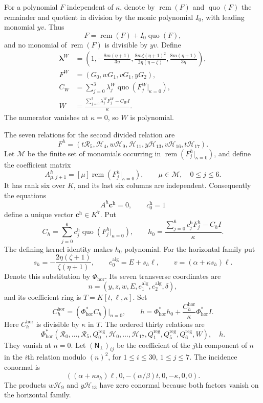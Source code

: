 \documentclass[11pt,a4paper]{article}
\numberwithin{equation}{section}
\theoremstyle{plain}
\theoremstyle{definition}
\theoremstyle{remark}
\begin{document}
For a polynomial $F$ independent of $\kappa$, denote by
$\operatorname{rem}(F)$ and $\operatorname{quo}(F)$ the remainder
and quotient in division by the monic polynomial $I_0$, with leading
monomial $yv$. Thus
\[
 F=\operatorname{rem}(F)+I_0\operatorname{quo}(F),
\]
and no monomial of $\operatorname{rem}(F)$ is divisible by $yv$.
Define
\[
\begin{aligned}
 \boldsymbol\lambda^W&=\left(1,-\frac{8m(\eta+1)}{3\eta},
       \frac{8m\zeta(\eta+1)^2}{3\eta(\eta-\zeta)},
       \frac{8m(\eta+1)}{3\eta}\right),\\
 F^W&=(G_0,wG_1,vG_1,yG_2),\\
 C_W&=\sum_{j=0}^3\lambda_j^W
           \operatorname{quo}(F^W_j|_{\kappa=0}),\\
 W&=\frac{\sum_{j=0}^3\lambda_j^WF^W_j-C_WI}{\kappa}.
\end{aligned}
\]
The numerator vanishes at $\kappa=0$, so $W$ is polynomial.

The seven relations for the second divided relation are
\[
 F^h=(t\mathcal R_5,\mathcal H_4,w\mathcal H_9,
       \mathcal H_{11},y\mathcal H_{13},
       v\mathcal H_{16},t\mathcal H_{17}).
\]
Let $\mathscr M$ be the finite set of monomials occurring in
$\operatorname{rem}(F^h_j|_{\kappa=0})$, and define the coefficient
matrix
\[
 A^h_{\mu,j+1}=[\mu]\operatorname{rem}(F^h_j|_{\kappa=0}),
 \qquad \mu\in\mathscr M,\quad 0\le j\le6.
\]
It has rank six over $K$, and its last six columns are independent.
Consequently the equations
\[
 A^h\boldsymbol c^{\mathrm h}=0,\qquad c_0^{\mathrm h}=1
\]
define a unique vector $\boldsymbol c^{\mathrm h}\in K^7$. Put
\[
 C_h=\sum_{j=0}^6c_j^{\mathrm h}\operatorname{quo}(F^h_j|_{\kappa=0}),
 \qquad h_0=\frac{\sum_{j=0}^6c_j^{\mathrm h}F^h_j-C_hI}{\kappa}.
\]
The defining kernel identity makes $h_0$ polynomial. For the horizontal family put
\[
 s_h=-\frac{2\eta(\zeta+1)}{\zeta(\eta+1)},\qquad
 e_0^{\mathrm{alg}}=E+s_h\ell,\qquad v=(\alpha+\kappa s_h)\ell.
\]
Denote this substitution by $\Phi_{\mathrm{hor}}$. Its seven transverse coordinates
are
\[
 n=(y,z,w,E,e_1^{\mathrm{alg}},e_2^{\mathrm{alg}},\delta),
\]
and its coefficient ring is $T=K[t,\ell,\kappa]$. Set
\[
 C_h^{\mathrm{hor}}=(\Phi_{\mathrm{hor}}^*C_h)|_{n=0},\qquad
 h=\Phi_{\mathrm{hor}}^*h_0+\frac{C_h^{\mathrm{hor}}}{\kappa}\Phi_{\mathrm{hor}}^*I.
\]
Here $C_h^{\mathrm{hor}}$ is divisible by $\kappa$ in $T$.
The ordered thirty relations are
\[
 \Phi_{\mathrm{hor}}^*(\mathcal R_0,\ldots,\mathcal R_5,Q_0^{\mathrm{reg}},
         \mathcal H_0,\ldots,\mathcal H_{17},
         Q_1^{\mathrm{reg}},Q_5^{\mathrm{reg}},Q_6^{\mathrm{reg}},W),\quad h.
\]
They vanish at $n=0$. Let $(\mathsf N_\perp)_{ij}$ be the coefficient of the $j$th component of $n$
in the $i$th relation modulo $(n)^2$, for $1\le i\le30$, $1\le j\le7$.
The incidence conormal is
\[
 ((\alpha+\kappa s_h)\ell,0,-(\alpha/\beta)t,0,-\kappa,0,0).
\]
The products $w\mathcal H_9$ and $y\mathcal H_{13}$ have zero
conormal because both factors vanish on the horizontal family.
\end{document}
